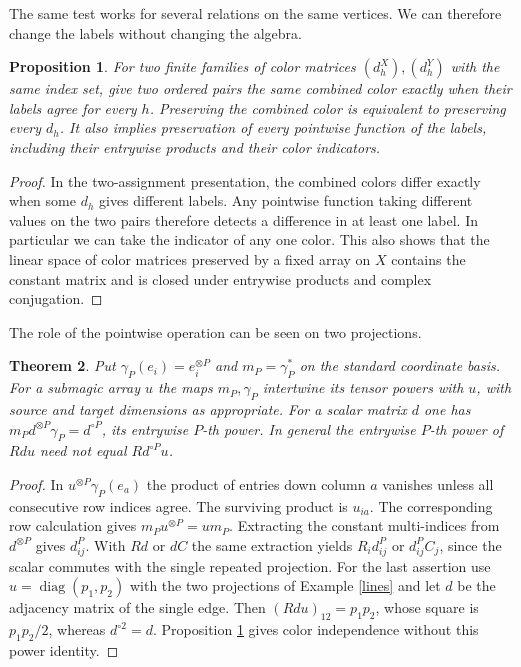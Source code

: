 \documentclass[11pt,a4paper]{article}
\newtheorem{thm}{Theorem}[section]
\newtheorem{prop}[thm]{Proposition}
\begin{document}
The same test works for several relations on the same vertices. We can therefore change the labels without changing the algebra.

\begin{prop}\label{jointcolor}
For two finite families of color matrices $(d_h^X),(d_h^Y)$ with the same index set, give two ordered pairs the same combined color exactly when their labels agree for every $h$. Preserving the combined color is equivalent to preserving every $d_h$. It also implies preservation of every pointwise function of the labels, including their entrywise products and their color indicators.
\end{prop}
\begin{proof}
In the two-assignment presentation, the combined colors differ exactly when some $d_h$ gives different labels. Any pointwise function taking different values on the two pairs therefore detects a difference in at least one label. In particular we can take the indicator of any one color. This also shows that the linear space of color matrices preserved by a fixed array on $X$ contains the constant matrix and is closed under entrywise products and complex conjugation.
\end{proof}

The role of the pointwise operation can be seen on two projections.

\begin{thm}
Put $\gamma_P(e_i)=e_i^{\otimes P}$ and $m_P=\gamma_P^*$ on the standard coordinate basis. For a submagic array $u$ the maps $m_P,\gamma_P$ intertwine its tensor powers with $u$, with source and target dimensions as appropriate. For a scalar matrix $d$ one has $m_Pd^{\otimes P}\gamma_P=d^{\circ P}$, its entrywise $P$-th power. In general the entrywise $P$-th power of $Rdu$ need not equal $Rd^{\circ P}u$.
\end{thm}
\begin{proof}
In $u^{\otimes P}\gamma_P(e_a)$ the product of entries down column $a$ vanishes unless all consecutive row indices agree. The surviving product is $u_{ia}$. The corresponding row calculation gives $m_Pu^{\otimes P}=um_P$. Extracting the constant multi-indices from $d^{\otimes P}$ gives $d_{ij}^P$. With $Rd$ or $dC$ the same extraction yields $R_i d_{ij}^P$ or $d_{ij}^P C_j$, since the scalar commutes with the single repeated projection. For the last assertion use $u=\operatorname{diag}(p_1,p_2)$ with the two projections of Example \ref{lines} and let $d$ be the adjacency matrix of the single edge. Then $(Rdu)_{12}=p_1p_2$, whose square is $p_1p_2/2$, whereas $d^{\circ2}=d$. Proposition \ref{jointcolor} gives color independence without this power identity.
\end{proof}
\end{document}
